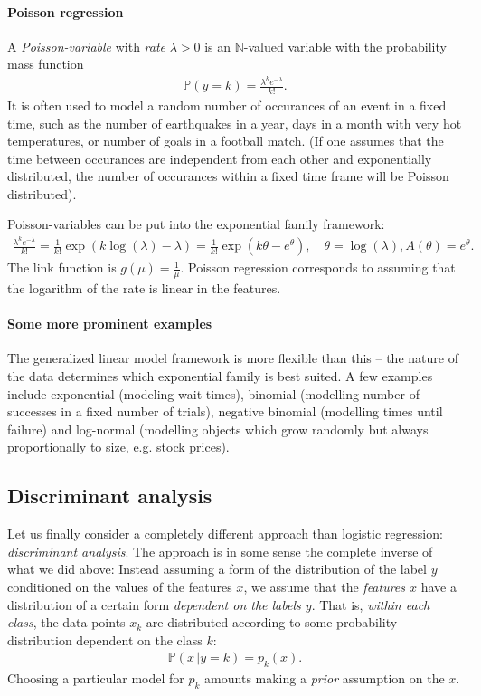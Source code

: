 \documentclass{article}
\newcommand{\N}{\mathbb{N}}
\begin{document}
\paragraph{Poisson regression} A \emph{Poisson-variable} with \emph{rate} $\lambda>0$ is an $\N$-valued variable with the probability mass function
\begin{align*}
    \mathbb{P}(y=k) = \frac{\lambda^ke^{-\lambda}}{k!}.
\end{align*}
It is often used to model a random number of occurances of an event in a fixed time, such as the number of earthquakes in a year, days in a month with very hot temperatures, or number of goals in a football match. (If one assumes that the time between occurances are independent from each other and exponentially distributed, the number of occurances within a fixed time frame will be Poisson distributed).

Poisson-variables can be put into the exponential family framework:
\begin{align*}
   \frac{\lambda^ke^{-\lambda}}{k!} =  \frac{1}{k!}\exp(k\log(\lambda)-\lambda) = \frac{1}{k!}\exp(k\theta - e^\theta), \quad  \theta = \log(\lambda), A(\theta) = e^\theta. 
\end{align*}
The link function is $g(\mu)=\frac{1}{\mu}$. Poisson regression corresponds to assuming that the logarithm of the rate is linear in the features.

\paragraph{Some more prominent examples} The generalized linear model framework is more flexible than this -- the nature of the data determines which exponential family is best suited. A few examples include exponential (modeling wait times), binomial (modelling number of successes in a fixed number of trials), negative binomial (modelling times until failure) and log-normal (modelling objects which grow randomly but always proportionally to size, e.g. stock prices).


\subsection{Discriminant analysis} 
Let us finally consider a completely different approach than logistic regression: \emph{discriminant analysis}. The approach is in some sense the complete inverse of what we did above: Instead assuming a form of the distribution of the label $y$ conditioned on the values of the features $x$, we assume that the \emph{features $x$} have a distribution of a certain form \emph{dependent on the labels $y$}. That is, \emph{within each class},
the data points $x_k$ are distributed according to some probability distribution dependent on the class $k$:
\begin{align*}
    \mathbb{P}(x \, \vert y=k)= p_k(x). 
\end{align*}
Choosing a particular model for $p_k$ amounts making a \emph{prior} assumption on the $x$.
\end{document}
